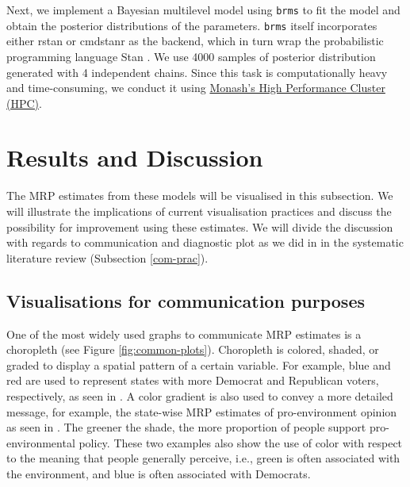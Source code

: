 \documentclass{monashthesis}
\begin{document}
Next, we implement a Bayesian multilevel model using \texttt{brms} \autocite{brms} to fit the model and obtain the posterior distributions of the parameters. \texttt{brms} itself incorporates either rstan or cmdstanr \autocite{cmdstanr} as the backend, which in turn wrap the probabilistic programming language Stan \autocite{stan}. We use 4000 samples of posterior distribution generated with 4 independent chains. Since this task is computationally heavy and time-consuming, we conduct it using \href{https://docs.monarch.erc.monash.edu/MonARCH/aboutMonArch.html}{Monash's High Performance Cluster (HPC)}.

\hypertarget{results-and-discussion}{%
\section{Results and Discussion}\label{results-and-discussion}}

The MRP estimates from these models will be visualised in this subsection. We will illustrate the implications of current visualisation practices and discuss the possibility for improvement using these estimates. We will divide the discussion with regards to communication and diagnostic plot as we did in in the systematic literature review (Subsection \ref{com-prac}).

\hypertarget{visualisations-for-communication-purposes}{%
\subsection{Visualisations for communication purposes}\label{visualisations-for-communication-purposes}}

One of the most widely used graphs to communicate MRP estimates is a choropleth (see Figure \ref{fig:common-plots}). Choropleth is colored, shaded, or graded to display a spatial pattern of a certain variable. For example, blue and red are used to represent states with more Democrat and Republican voters, respectively, as seen in \textcite{GhitzaYair2013DIwM}. A color gradient is also used to convey a more detailed message, for example, the state-wise MRP estimates of pro-environment opinion as seen in \textcite{EunKimSung2018Epoi}. The greener the shade, the more proportion of people support pro-environmental policy. These two examples also show the use of color with respect to the meaning that people generally perceive, i.e., green is often associated with the environment, and blue is often associated with Democrats.
\end{document}
